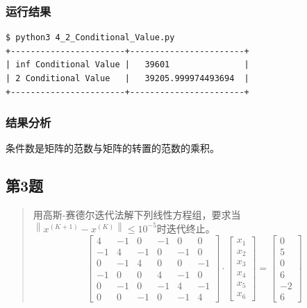 \subsubsection{运行结果}

\begin{lstlisting}[style = bash]
$ python3 4_2_Conditional_Value.py 
+-----------------------+-----------------------+
| inf Conditional Value |   39601               |
| 2 Conditional Value   |   39205.999974493694  |
+-----------------------+-----------------------+
\end{lstlisting}

\subsubsection{结果分析}
条件数是矩阵的范数与矩阵的转置的范数的乘积。

\subsection{第3题}
\begin{quote}
    用高斯-赛德尔迭代法解下列线性方程组，要求当$\left\|x^{(K+1)}-x^{(K)}\right\| \leq 10^{-5}$时迭代终止。
    \begin{equation}
    \left[ \begin{array}{rrrrrrr}{4} & {-1} & {0} & {-1} & {0} & {0} \\ {-1} & {4} & {-1} & {0} & {-1} & {0} \\ {0} & {-1} & {4} & {0} & {0} & {-1} \\ {-1} & {0} & {0} & {4} & {-1} & {0} \\ {0} & {-1} & {0} & {-1} & {4} & {-1} \\ {0} & {0} & {-1} & {0} & {-1} & {4}\end{array}\right] \cdot \left[ \begin{array}{c}{x_{1}} \\ {x_{2}} \\ {x_{3}} \\ {x_{4}} \\ {x_{5}} \\ {x_{6}}\end{array}\right]=\left[ \begin{array}{r}{0} \\ {5} \\ {0} \\ {6} \\ {-2} \\ {6}\end{array}\right]
    \end{equation}
\end{quote}

